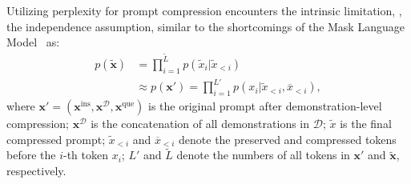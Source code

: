 Utilizing perplexity for prompt compression encounters the intrinsic limitation, \ie, the independence assumption, similar to the shortcomings of the Mask Language Model~\cite{yang2019xlnet}
as: %
\begin{equation}
\begin{aligned}
p(\bm{\widetilde{x}}) &= \prod_{i=1}^{\widetilde{L}} p(\widetilde{x}_i|\widetilde{x}_{<i}) 	 \\
&\approx p(\bm{x}') = \prod_{i=1}^{L'} p(x_i|\widetilde{x}_{<i}, \overline{x}_{<i}),
\label{eq:prompt_ppl}
\end{aligned}
\end{equation}
where $\bm{x}'= (\bm{x}^{\text{ins}}, \bm{x}^{\mathcal{D}}, \bm{x}^{\text{que}})$ is the original prompt after demonstration-level compression; 
$\bm{x}^{\mathcal{D}}$ is the concatenation of all demonstrations in $\mathcal{D}$; 
$\widetilde{x}$ is the final compressed prompt; 
$\widetilde{x}_{<i}$ and $\overline{x}_{<i}$ denote the preserved and compressed tokens before the $i$-th token $x_i$;
$L'$ and $\widetilde{L}$ denote the numbers of all tokens in $\bm{x}'$ and $\widetilde{\bm{x}}$, respectively.



